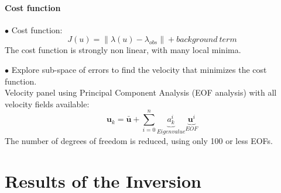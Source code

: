 \documentclass[compress,slidescentered,notes=show]{beamer}
\begin{document}
	\subsection{Cost function}
\begin{frame}
  \begin{block}{}
    $\bullet$ Cost function:
    $$J(u)=\|\lambda(u)- \lambda_{obs}\| + background\ term $$
    The cost function is strongly non linear, with many local minima.\\
  \end{block}
  \vspace{0.6cm}
  \begin{block}{}
    $\bullet$ Explore sub-space of errors to find the velocity that minimizes the cost function. \\
    Velocity panel using Principal Component Analysis (EOF analysis) with all velocity fields available:
    $$\textbf{u}_k = \bar{\textbf{u}} + \sum_{i=0}^n{\underbrace{a_k^i}_{Eigenvalue}\underbrace{\textbf{u}^i}_{EOF_{}}}$$
    The number of degrees of freedom is reduced, using only 100 or less EOFs. \\
  \end{block}
  \vspace{0.2cm}

\end{frame}

\part{Results of the Inversion}

\begin{frame}
  \frametitle{\insertromanpartnumber \hspace{1em} \insertpart}
  \tableofcontents[hideotherpart]
\end{frame}
\end{document}
